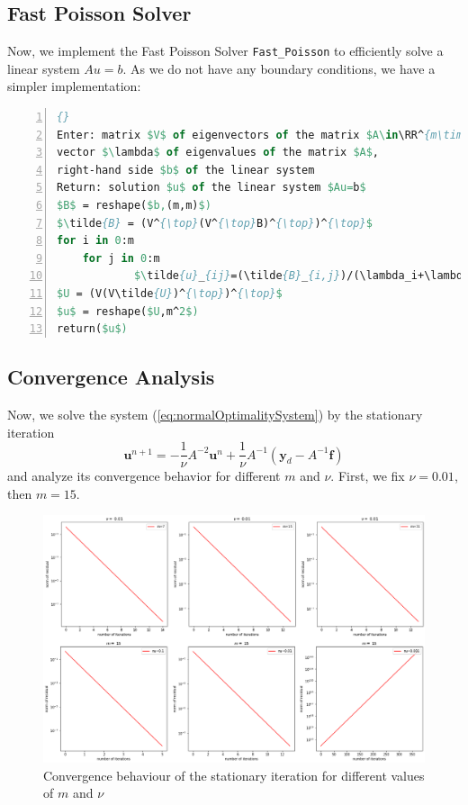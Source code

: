\documentclass{amsart}
\theoremstyle{definition}
\theoremstyle{remark}
\numberwithin{equation}{section}
\newcommand{\RR}{\mathbb{R}}
\renewcommand{\vec}{\textbf}
\begin{document}

\subsection{Fast Poisson Solver}
Now, we implement the Fast Poisson Solver \texttt{Fast\_Poisson} to efficiently solve a linear system $Au=b$. As we do not have any boundary conditions, we have a simpler implementation:

\begin{lstlisting}[mathescape, language=Pascal, title=Fast\_Poisson,
frame=single, numbers=left, numberstyle=\tiny, tabsize=2,
morekeywords={Enter, Return, elif}, deletekeywords={of}, keywordstyle=\bfseries]{}
Enter: matrix $V$ of eigenvectors of the matrix $A\in\RR^{m\times m}$, 
vector $\lambda$ of eigenvalues of the matrix $A$, 
right-hand side $b$ of the linear system
Return: solution $u$ of the linear system $Au=b$
$B$ = reshape($b,(m,m)$)
$\tilde{B} = (V^{\top}(V^{\top}B)^{\top})^{\top}$
for i in 0:m
	for j in 0:m
			$\tilde{u}_{ij}=(\tilde{B}_{i,j})/(\lambda_i+\lambda_j)$
$U = (V(V\tilde{U})^{\top})^{\top}$
$u$ = reshape($U,m^2$)
return($u$)
\end{lstlisting}


\subsection{Convergence Analysis}
Now, we solve the system (\ref{eq:normalOptimalitySystem}) by the stationary iteration
\begin{equation}
\vec{u}^{n+1} = -\frac{1}{\nu} A^{-2}\vec{u}^n + \frac{1}{\nu} A^{-1} (\vec{y}_d-A^{-1}\vec{f})
\end{equation}
and analyze its convergence behavior for different $m$ and $\nu$. First, we fix $\nu=0.01$, then $m=15$.

\begin{figure}[h!]
	\centering
	\includegraphics[scale=1.7]{./imgs/convergence_stationary}
	\caption{Convergence behaviour of the stationary iteration for different values of $m$ and $\nu$}
\end{figure}
\end{document}

